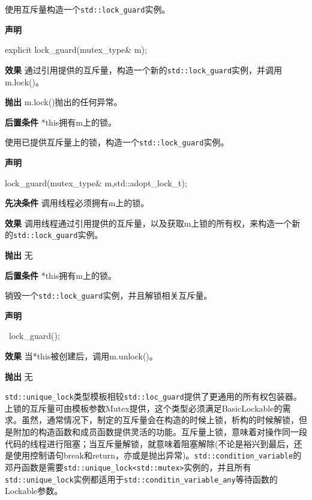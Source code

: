 使用互斥量构造一个\texttt{std::lock\_guard}实例。

\textbf{声明}

\begin{cpp}
explicit lock_guard(mutex_type& m);
\end{cpp}

\textbf{效果}
通过引用提供的互斥量，构造一个新的\texttt{std::lock\_guard}实例，并调用m.lock()。

\textbf{抛出}
m.lock()抛出的任何异常。

\textbf{后置条件}
*this拥有m上的锁。


使用已提供互斥量上的锁，构造一个\texttt{std::lock\_guard}实例。

\textbf{声明}

\begin{cpp}
lock_guard(mutex_type& m,std::adopt_lock_t);
\end{cpp}

\textbf{先决条件}
调用线程必须拥有m上的锁。

\textbf{效果}
调用线程通过引用提供的互斥量，以及获取m上锁的所有权，来构造一个新的\texttt{std::lock\_guard}实例。

\textbf{抛出}
无

\textbf{后置条件}
*this拥有m上的锁。


销毁一个\texttt{std::lock\_guard}实例，并且解锁相关互斥量。

\textbf{声明}

\begin{cpp}
~lock_guard();
\end{cpp}

\textbf{效果}
当*this被创建后，调用m.unlock()。

\textbf{抛出}
无


\texttt{std::unique\_lock}类型模板相较\texttt{std::loc\_guard}提供了更通用的所有权包装器。上锁的互斥量可由模板参数Mutex提供，这个类型必须满足BasicLockable的需求。虽然，通常情况下，制定的互斥量会在构造的时候上锁，析构的时候解锁，但是附加的构造函数和成员函数提供灵活的功能。互斥量上锁，意味着对操作同一段代码的线程进行阻塞；当互斥量解锁，就意味着阻塞解除(不论是裕兴到最后，还是使用控制语句break和return，亦或是抛出异常)。\texttt{std::condition\_variable}的邓丹函数是需要\texttt{std::unique\_lock<std::mutex>}实例的，并且所有\texttt{std::unique\_lock}实例都适用于\texttt{std::conditin\_variable\_any}等待函数的Lockable参数。

